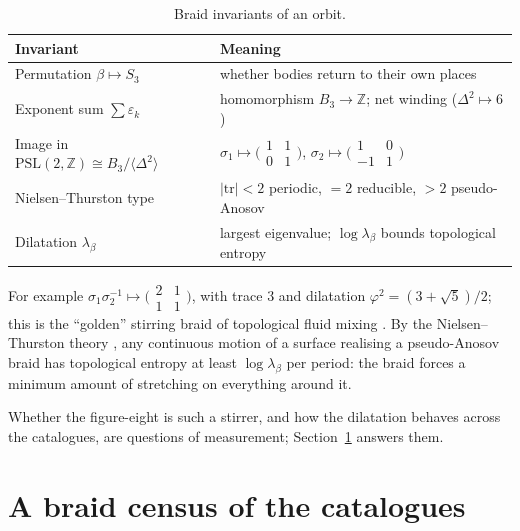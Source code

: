\documentclass[11pt]{article}
\theoremstyle{remark}
\newcommand{\Z}{\mathbb{Z}}
\newcommand{\PSL}{\mathrm{PSL}}
\begin{document}
\begin{table}[h]
\centering
\begin{tabular}{@{}ll@{}}
\toprule
Invariant & Meaning\\
\midrule
Permutation $\beta\mapsto S_3$ & whether bodies return to their own places\\
Exponent sum $\sum\varepsilon_k$ & homomorphism $B_3\to\Z$; net winding ($\Delta^2\mapsto6$)\\
Image in $\PSL(2,\Z)\cong B_3/\langle\Delta^2\rangle$ & $\sigma_1\mapsto\bigl(\begin{smallmatrix}1&1\\0&1\end{smallmatrix}\bigr)$,
  $\sigma_2\mapsto\bigl(\begin{smallmatrix}1&0\\-1&1\end{smallmatrix}\bigr)$\\
Nielsen--Thurston type & $|\mathrm{tr}|<2$ periodic, $=2$ reducible, $>2$ pseudo-Anosov\\
Dilatation $\lambda_\beta$ & largest eigenvalue; $\log\lambda_\beta$ bounds topological entropy\\
\bottomrule
\end{tabular}
\caption{Braid invariants of an orbit.}
\label{tab:invariants}
\end{table}

\noindent For example $\sigma_1\sigma_2^{-1}\mapsto\bigl(\begin{smallmatrix}2&1\\1&1\end{smallmatrix}\bigr)$,
with trace $3$ and dilatation $\varphi^2=(3+\sqrt5)/2$; this is the ``golden'' stirring braid of topological
fluid mixing \cite{BoylandArefStremler2000}. By the Nielsen--Thurston theory \cite{Thurston1988}, any
continuous motion of a surface realising a pseudo-Anosov braid has topological entropy at least
$\log\lambda_\beta$ per period: the braid forces a minimum amount of stretching on everything around it.

\noindent Whether the figure-eight is such a stirrer, and how the dilatation behaves across the catalogues, are
questions of measurement; Section~\ref{sec:census} answers them.

\section{A braid census of the catalogues}
\label{sec:census}
\end{document}
